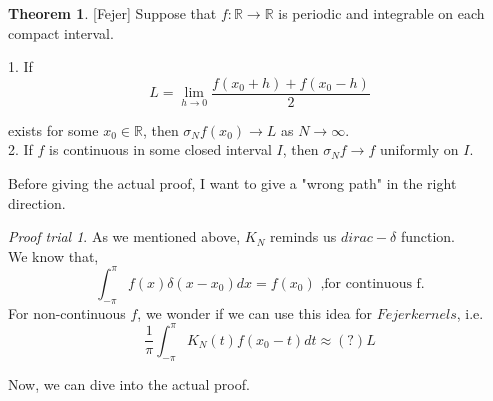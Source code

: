 \documentclass{article}
\theoremstyle{remark}
\theoremstyle{lemma}
\theoremstyle{example}
\theoremstyle{proofTrial}
\newtheorem*{proofTrial}{Proof trial}
\theoremstyle{definition}
\newtheorem{theorem}{Theorem}
\begin{document}
\begin{theorem}{[Fejer]}
    Suppose that $f: \mathbb{R} \to \mathbb{R}$ is periodic and integrable on each compact interval.\footnotemark{} 

        1. If \begin{equation}
             L = \lim_{h \to 0} \frac{f(x_0 + h) + f(x_0 - h)}{2}
        \end{equation}

        exists for some $x_0 \in \mathbb{R}$, then $\sigma_Nf(x_0) \to L$ as $N \to \infty$.   \\
        2. If \(f\) is continuous in some closed interval $I$, then $\sigma_Nf \to f$ uniformly on $I$.

\end{theorem}
Before giving the actual proof, I want to give a "wrong path" in the right direction.
\begin{proofTrial}
    {As we mentioned above, $K_N$ reminds us $dirac-\delta$ function.}\\
   { We know that,}
    \[
    \int_{-\pi}^{\pi}f(x)\delta(x - x_0)dx = f(x_0) \text{  ,for continuous f.}
    \]
    For non-continuous \(f\), we wonder if we can use this idea for $Fejer kernels$, i.e.
    \[
    \frac{1}{\pi}\int_{-\pi}^{\pi} K_N(t)f(x_0 - t)dt \approx(?) L
    \]\footnotemark{}
\end{proofTrial}
Now, we can dive into the actual proof.
\end{document}
